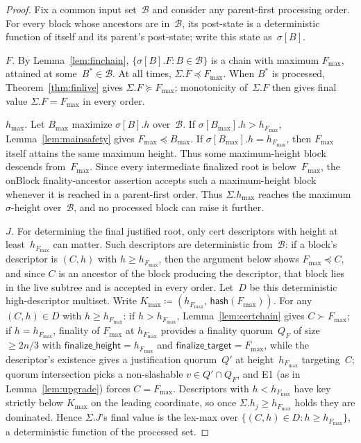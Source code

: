 \documentclass{article}
\newcommand{\finalizeHeight}{\mathsf{finalize\_height}}
\newcommand{\finalizeTarget}{\mathsf{finalize\_target}}
\newcommand{\hash}{\mathsf{hash}}
\newcommand{\hmax}{\ensuremath{h_{\max}}\xspace}
\newcommand{\onBlock}{\textsf{onBlock}\xspace}
\theoremstyle{plain}
\theoremstyle{definition}
\theoremstyle{remark}
\begin{document}
\begin{proof}
Fix a common input set~$\mathcal B$ and consider any parent-first processing order.
For every block whose ancestors are in~$\mathcal B$, its post-state is a deterministic function of itself and its parent's post-state; write this state as~$\sigma[B]$.

\emph{$F$.} By Lemma~\ref{lem:finchain}, $\{\sigma[B].F : B \in \mathcal B\}$ is a chain with maximum $F_{\max}$, attained at some~$B^\ast \in \mathcal B$.
At all times, $\Sigma.F \preceq F_{\max}$.
When $B^\ast$ is processed, Theorem~\ref{thm:finlive} gives $\Sigma.F \succeq F_{\max}$; monotonicity of~$\Sigma.F$ then gives final value $\Sigma.F=F_{\max}$ in every order.

\emph{$\hmax$.} Let $B_{\max}$ maximize $\sigma[B].h$ over~$\mathcal B$.
If $\sigma[B_{\max}].h > h_{F_{\max}}$, Lemma~\ref{lem:mainsafety} gives $F_{\max} \preceq B_{\max}$.
If $\sigma[B_{\max}].h = h_{F_{\max}}$, then $F_{\max}$ itself attains the same maximum height.
Thus some maximum-height block descends from~$F_{\max}$.
Since every intermediate finalized root is below~$F_{\max}$, the \onBlock finality-ancestor assertion accepts such a maximum-height block whenever it is reached in a parent-first order.
Thus $\Sigma.\hmax$ reaches the maximum $\sigma$-height over~$\mathcal B$, and no processed block can raise it further.

\emph{$J$.} For determining the final justified root, only cert descriptors with height at least~$h_{F_{\max}}$ can matter.
Such descriptors are deterministic from~$\mathcal B$: if a block's descriptor is $(C,h)$ with $h\geq h_{F_{\max}}$, then the argument below shows $F_{\max}\preceq C$, and since $C$ is an ancestor of the block producing the descriptor, that block lies in the live subtree and is accepted in every order.
Let~$D$ be this deterministic high-descriptor multiset.
Write $K_{\max} \coloneqq (h_{F_{\max}},\, \hash(F_{\max}))$.
For any $(C, h) \in D$ with $h \geq h_{F_{\max}}$: if $h > h_{F_{\max}}$, Lemma~\ref{lem:certchain} gives $C \succ F_{\max}$; if $h = h_{F_{\max}}$, finality of $F_{\max}$ at $h_{F_{\max}}$ provides a finality quorum~$Q_F$ of size $\geq 2n/3$ with $\finalizeHeight = h_{F_{\max}}$ and $\finalizeTarget = F_{\max}$, while the descriptor's existence gives a justification quorum~$Q'$ at height~$h_{F_{\max}}$ targeting~$C$; quorum intersection picks a non-slashable $v \in Q' \cap Q_F$, and E1 (as in Lemma~\ref{lem:upgrade}) forces $C = F_{\max}$.
Descriptors with $h < h_{F_{\max}}$ have key strictly below $K_{\max}$ on the leading coordinate, so once $\Sigma.h_j \geq h_{F_{\max}}$ holds they are dominated.
Hence $\Sigma.J$'s final value is the lex-max over $\{(C, h) \in D : h \geq h_{F_{\max}}\}$, a deterministic function of the processed set.


\end{proof}
\end{document}
